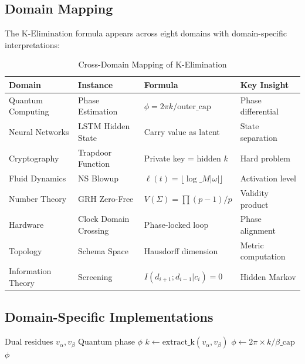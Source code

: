 \documentclass[11pt,letterpaper]{article}
\newcommand{\KElim}{\text{K-Elimination}}
\begin{document}
\subsection{Domain Mapping}

The \(\KElim\) formula appears across eight domains with domain-specific interpretations:

\begin{table}[h]
\centering
\caption{Cross-Domain Mapping of K-Elimination}
\label{tab:cross-domain}
\begin{tabular}{llll}
\toprule
Domain & Instance & Formula & Key Insight \\
\midrule
Quantum Computing & Phase Estimation & \(\phi = 2\pi k / \text{outer\_cap}\) & Phase differential \\
Neural Networks & LSTM Hidden State & Carry value as latent & State separation \\
Cryptography & Trapdoor Function & Private key = hidden \(k\) & Hard problem \\
Fluid Dynamics & NS Blowup & \(\ell(t) = \lfloor \log\_M |\omega| \rfloor\) & Activation level \\
Number Theory & GRH Zero-Free & \(V(\Sigma) = \prod (p-1)/p\) & Validity product \\
Hardware & Clock Domain Crossing & Phase-locked loop & Phase alignment \\
Topology & Schema Space & Hausdorff dimension & Metric computation \\
Information Theory & Screening & \(I(d_{i+1}; d_{i-1} | c_i) = 0\) & Hidden Markov \\
\bottomrule
\end{tabular}
\end{table}

\subsection{Domain-Specific Implementations}

\begin{algorithm}[h]
\caption{Quantum Phase Estimation using K-Elimination}
\label{alg:quantum}
\begin{algorithmic}[1]
 Dual residues \(v_{\alpha}, v_{\beta}\)
 Quantum phase \(\phi\)
\STATE \(k \gets \text{extract\_k}(v_{\alpha}, v_{\beta})\)
\STATE \(\phi \gets 2\pi \times k / \beta\text{\_cap}\)
 \(\phi\)
\end{algorithmic}
\end{algorithm}
\end{document}

